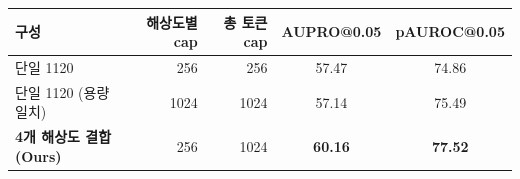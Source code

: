 \documentclass[10pt,letterpaper]{article}
\begin{document}
\noindent\scriptsize\setlength{\tabcolsep}{4pt}
\begin{tabular}{l r r c c}
\toprule
구성 & 해상도별 cap & 총 토큰 cap & AUPRO@0.05 & pAUROC@0.05 \\
\midrule
단일 1120 & 256 & 256 & 57.47 & 74.86 \\
단일 1120 (용량 일치) & 1024 & 1024 & 57.14 & 75.49 \\
\textbf{4개 해상도 결합 (Ours)} & 256 & 1024 & \textbf{60.16} & \textbf{77.52} \\
\bottomrule
\end{tabular}
\end{document}
